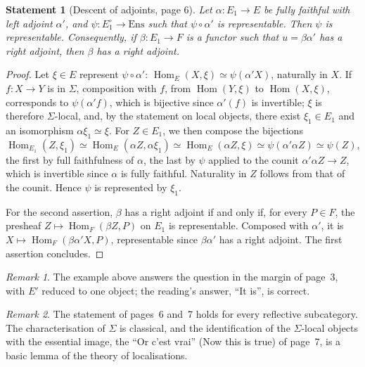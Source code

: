 \documentclass[11pt]{article}
\newcommand{\q}[1]{“#1”}
\theoremstyle{plain}
\newtheorem*{enonce}{Statement}
\theoremstyle{definition}
\theoremstyle{remark}
\newtheorem*{remarque}{Remark}
\begin{document}
\begin{enonce}[Descent of adjoints, page 6]
Let $\alpha : E_1 \to E$ be fully faithful with left adjoint $\alpha'$, and $\psi : E_1^{\circ} \to \mathrm{Ens}$ such that $\psi \circ \alpha'$ is representable. Then $\psi$ is representable. Consequently, if $\beta : E_1 \to F$ is a functor such that $u = \beta\alpha'$ has a right adjoint, then $\beta$ has a right adjoint.
\end{enonce}

\begin{proof}
Let $\xi \in E$ represent $\psi \circ \alpha'$: $\operatorname{Hom}_E(X, \xi) \simeq \psi(\alpha' X)$, naturally in $X$. If $f : X \to Y$ is in $\Sigma$, composition with $f$, from $\operatorname{Hom}(Y, \xi)$ to $\operatorname{Hom}(X, \xi)$, corresponds to $\psi(\alpha' f)$, which is bijective since $\alpha'(f)$ is invertible; $\xi$ is therefore $\Sigma$-local, and, by the statement on local objects, there exist $\xi_1 \in E_1$ and an isomorphism $\alpha \xi_1 \simeq \xi$. For $Z \in E_1$, we then compose the bijections
\[
  \operatorname{Hom}_{E_1}(Z, \xi_1) \simeq \operatorname{Hom}_E(\alpha Z, \alpha \xi_1) \simeq \operatorname{Hom}_E(\alpha Z, \xi) \simeq \psi(\alpha'\alpha Z) \simeq \psi(Z),
\]
the first by full faithfulness of $\alpha$, the last by $\psi$ applied to the counit $\alpha'\alpha Z \to Z$, which is invertible since $\alpha$ is fully faithful. Naturality in $Z$ follows from that of the counit. Hence $\psi$ is represented by $\xi_1$.

For the second assertion, $\beta$ has a right adjoint if and only if, for every $P \in F$, the presheaf $Z \mapsto \operatorname{Hom}_F(\beta Z, P)$ on $E_1$ is representable. Composed with $\alpha'$, it is $X \mapsto \operatorname{Hom}_F(\beta\alpha' X, P)$, representable since $\beta\alpha'$ has a right adjoint. The first assertion concludes.
\end{proof}

\begin{remarque}
The example above answers the question in the margin of page~3, with $E'$ reduced to one object; the reading's answer, \q{It is}, is correct.
\end{remarque}

\begin{remarque}
The statement of pages~6 and~7 holds for every reflective subcategory. The characterisation of $\Sigma$ is classical, and the identification of the $\Sigma$-local objects with the essential image, the \q{Or c'est vrai} (Now this is true) of page~7, is a basic lemma of the theory of localisations.
\end{remarque}
\end{document}
